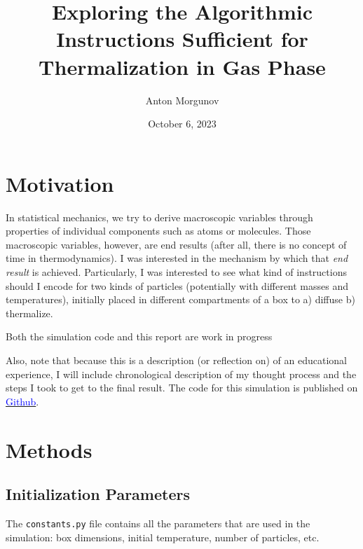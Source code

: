 \documentclass[12pt]{article}
\begin{document}
\title{Exploring the Algorithmic Instructions Sufficient for Thermalization in Gas Phase}
\author{Anton Morgunov}
\date{October 6, 2023}

\maketitle



\section{Motivation}
In statistical mechanics, we try to derive macroscopic variables through properties of individual components such as atoms or molecules. Those macroscopic variables, however, are end results (after all, there is no concept of time in thermodynamics). I was interested in the mechanism by which that \textit{end result} is achieved. Particularly, I was interested to see what kind of instructions should I encode for two kinds of particles (potentially with different masses and temperatures), initially placed in different compartments of a box to a) diffuse b) thermalize. 

\begin{warningbox}
    Both the simulation code and this report are work in progress
\end{warningbox}

Also, note that because this is a description (or reflection on) of an educational experience, I will include chronological description of my thought process and the steps I took to get to the final result. The code for this simulation is published on \href{https://github.com/anmorgunov/statmech-simulation}{\textcolor{blue}{Github}}. 

\section{Methods}
\subsection{Initialization Parameters}
The \texttt{constants.py} file contains all the parameters that are used in the simulation: box dimensions, initial temperature, number of particles, etc.
\end{document}

